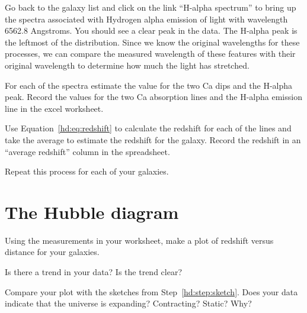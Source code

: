Go back to the galaxy list and click on the
link “H-alpha spectrum” to bring up the spectra associated with
Hydrogen alpha emission of light with wavelength 6562.8 Angstroms.
You should see a clear peak in the data. The H-alpha peak is the leftmost
of the distribution. Since we know the original wavelengths for these
processes, we can compare the measured wavelength of these features
with their original wavelength to determine how much the light has
stretched.

\begin{steps}
	\item For each of the spectra estimate the value for the two Ca dips and the H-alpha peak. Record the values for the two Ca absorption lines and the H-alpha emission line in the excel worksheet. 
	
	\item Use Equation~\ref{hd:eq:redshift} to calculate the redshift for each of the lines and take the average to
estimate the redshift for the galaxy. Record the redshift in an “average
redshift” column in the spreadsheet.

	\item Repeat this process for each of
your galaxies.
\end{steps}

%
%
%	
%	

\section{The Hubble diagram}

\begin{steps}
	
	\item Using the measurements in your worksheet, make a plot of redshift
	versus distance for your galaxies.
	
	\item Is there a trend in your data? Is the trend clear?
	
	\item Compare your plot with the sketches from Step~\ref{hd:step:sketch}. Does your data
	indicate that the universe is expanding? Contracting? Static? Why?

\end{steps}

